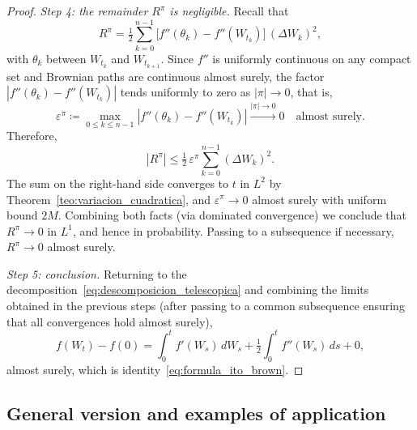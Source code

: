 \documentclass[11pt,a4paper,oneside]{report}
\theoremstyle{plain}
\theoremstyle{definition}
\theoremstyle{remark}
\newcommand{\1}{\mathbf{1}}
\newcommand{\eqdef}{\coloneqq}
\begin{document}
\begin{proof}
\emph{Step 4: the remainder $R^\pi$ is negligible.} Recall that
\begin{equation*}
  R^\pi = \tfrac{1}{2} \sum_{k=0}^{n-1}
            \bigl[f''(\theta_k) - f''(W_{t_k})\bigr]\, (\Delta W_k)^2,
\end{equation*}
with $\theta_k$ between $W_{t_k}$ and $W_{t_{k+1}}$. Since $f''$ is
uniformly continuous on any compact set and Brownian paths are
continuous almost surely, the factor $|f''(\theta_k) - f''(W_{t_k})|$
tends uniformly to zero as $|\pi| \to 0$, that is,
\begin{equation*}
  \varepsilon^\pi \eqdef \max_{0 \leq k \leq n-1}
                          |f''(\theta_k) - f''(W_{t_k})|
                          \xrightarrow{|\pi| \to 0} 0
  \quad \text{almost surely}.
\end{equation*}
Therefore,
\begin{equation*}
  |R^\pi| \leq \tfrac{1}{2}\, \varepsilon^\pi
              \sum_{k=0}^{n-1} (\Delta W_k)^2.
\end{equation*}
The sum on the right-hand side converges to $t$ in $L^2$ by
Theorem~\ref{teo:variacion_cuadratica}, and $\varepsilon^\pi \to 0$
almost surely with uniform bound $2M$. Combining both facts (via
dominated convergence) we conclude that $R^\pi \to 0$ in $L^1$, and
hence in probability. Passing to a subsequence if necessary,
$R^\pi \to 0$ almost surely.

\emph{Step 5: conclusion.} Returning to the
decomposition~\eqref{eq:descomposicion_telescopica} and combining the
limits obtained in the previous steps (after passing to a common
subsequence ensuring that all convergences hold almost surely),
\begin{equation*}
  f(W_t) - f(0) = \int_0^t f'(W_s)\, dW_s
                + \tfrac{1}{2} \int_0^t f''(W_s)\, ds
                + 0,
\end{equation*}
almost surely, which is identity~\eqref{eq:formula_ito_brown}.
\end{proof}

\medskip

\subsection{General version and examples of application}
\label{subsec:formula_ito_general}

\medskip
\end{document}
